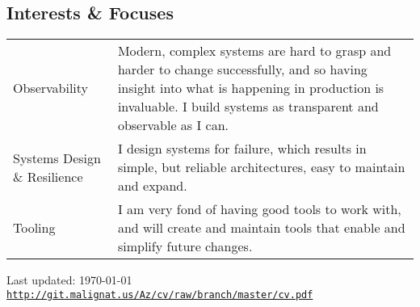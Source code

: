\documentclass[a4paper]{article}
\def\footerlink{http://git.malignat.us/Az/cv/raw/branch/master/cv.pdf}
\begin{document}
\subsection*{Interests \& Focuses}
\begin{tabular}{ p{2.75cm} | p{14cm} }
  Observability & Modern, complex systems are hard to grasp and harder to change
  successfully, and so having insight into what is happening in production is
  invaluable. I build systems as transparent and observable as I
  can. \\
Systems Design \& Resilience & I design systems for failure, which results in simple,
but reliable architectures, easy to maintain and expand.\\
Tooling & I am very fond of having good tools to work with, and will create and
maintain tools that enable and simplify future changes. \\
\end{tabular}

\vfill

\begin{center}
  \begin{footnotesize}
    Last updated: \today \\
    \href{\footerlink}{\texttt{\footerlink}}
  \end{footnotesize}
\end{center}
\end{document}
